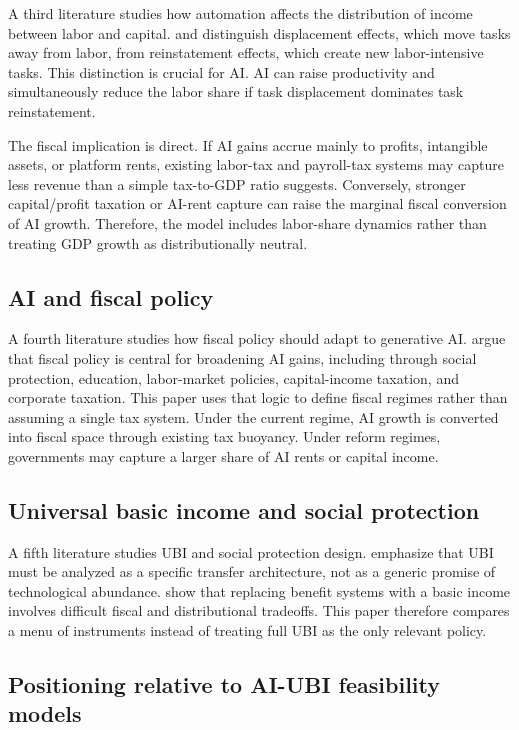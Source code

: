 \documentclass[11pt,a4paper]{article}
\begin{document}
A third literature studies how automation affects the distribution of income between labor and capital. \citet{acemoglu2018race} and \citet{acemoglu2019automation} distinguish displacement effects, which move tasks away from labor, from reinstatement effects, which create new labor-intensive tasks. This distinction is crucial for AI. AI can raise productivity and simultaneously reduce the labor share if task displacement dominates task reinstatement.

The fiscal implication is direct. If AI gains accrue mainly to profits, intangible assets, or platform rents, existing labor-tax and payroll-tax systems may capture less revenue than a simple tax-to-GDP ratio suggests. Conversely, stronger capital/profit taxation or AI-rent capture can raise the marginal fiscal conversion of AI growth. Therefore, the model includes labor-share dynamics rather than treating GDP growth as distributionally neutral.

\subsection{AI and fiscal policy}

A fourth literature studies how fiscal policy should adapt to generative AI. \citet{brollo2024fiscal} argue that fiscal policy is central for broadening AI gains, including through social protection, education, labor-market policies, capital-income taxation, and corporate taxation. This paper uses that logic to define fiscal regimes rather than assuming a single tax system. Under the current regime, AI growth is converted into fiscal space through existing tax buoyancy. Under reform regimes, governments may capture a larger share of AI rents or capital income.

\subsection{Universal basic income and social protection}

A fifth literature studies UBI and social protection design. \citet{gentilini2020ubi} emphasize that UBI must be analyzed as a specific transfer architecture, not as a generic promise of technological abundance. \citet{oecd2017basicincome} show that replacing benefit systems with a basic income involves difficult fiscal and distributional tradeoffs. This paper therefore compares a menu of instruments instead of treating full UBI as the only relevant policy.

\subsection{Positioning relative to AI-UBI feasibility models}
\end{document}

